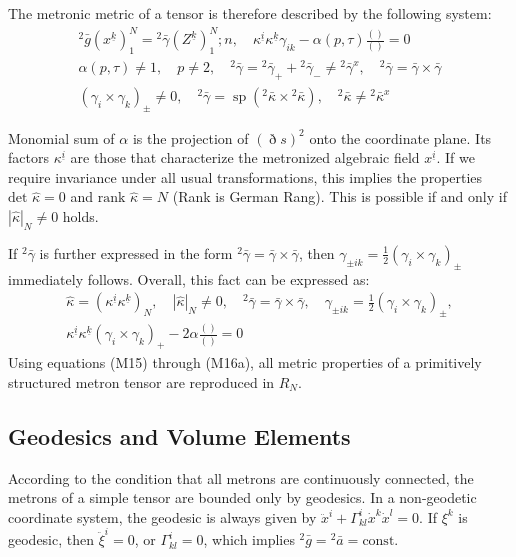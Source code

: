 \documentclass[11pt,a4paper,oneside]{article}
\DeclareMathOperator{\spn}{sp}
\newcommand{\ethop}{\eth}
\begin{document}
The metronic metric of a tensor is therefore described by the following system:
\begin{equation}
    \begin{gathered}
    {}^2 \bar{g}(x^{\underline{k}})^N_1 = {}^2 \bar{\gamma}(Z^{\underline{k}})^N_1; n,\quad \kappa^{\underline{i}} \kappa^{\underline{k}} \gamma_{ik}-\alpha(p,\tau)\frac { ()}{()} = 0 \\
    \alpha(p,\tau)\neq 1,\quad p \neq 2,\quad {}^2 \bar{\gamma} = {}^2 \bar{ \gamma}_+ + {}^2 \bar{\gamma}_- \neq {}^2 \bar{\gamma}^x,\quad {}^2 \bar{\gamma} = \bar{\gamma} \times \bar{\gamma} \\
    (\gamma_i \times \gamma_k)_{\pm} \neq 0,\quad {}^2 \bar{\gamma} = \spn({}^2 \bar{\kappa} \times {}^2 \bar{\kappa}),\quad {}^2 \bar{\kappa} \neq {}^2 \bar{\kappa}^x 
    \end{gathered} \tag {M16}
\end{equation}

Monomial sum of $\alpha$ is the projection of $(\ethop s)^2$ onto the coordinate plane. Its factors $\kappa^{\underline{i}}$ are those that characterize the metronized algebraic field $x^{\underline{i}}$. If we require invariance under all usual transformations, this implies the properties $\text{det } \hat {\kappa} = 0$ and $\text{rank } \hat {\kappa} = N$ (Rank is German Rang). This is possible if and only if $| \hat {\kappa} |_N \neq 0$ holds.

If ${}^2 \bar{\gamma}$ is further expressed in the form ${}^2 \bar{\gamma} = \bar{\gamma} \times \bar{\gamma}$, then $\gamma_{\pm ik} = \frac {1}{2}(\gamma_i \times \gamma_k)_{\pm}$ immediately follows. Overall, this fact can be expressed as:
\begin{equation}
    \begin{gathered}
    \hat {\kappa} =(\kappa^{\underline {i}} \kappa^{\underline {k}})_N,\quad | \hat {\kappa} |_N \neq 0,\quad {}^2 \bar{\gamma} = \bar{\gamma} \times \bar{\gamma},\quad \gamma_{\pm ik} = \frac {1}{2}( \gamma_i \times \gamma_k)_{\pm}, \\
    \kappa^{\underline{i}} \kappa^{\underline{k}}(\gamma_i \times \gamma_k)_+ -2 \alpha \frac {()}{()} = 0 
    \end{gathered} \tag {M16a}
\end{equation}
Using equations (M15) through (M16a), all metric properties of a primitively structured metron tensor are reproduced in $R_N$.

\subsection{Geodesics and Volume Elements}
According to the condition that all metrons are continuously connected, the metrons of a simple tensor are bounded only by geodesics. In a non-geodetic coordinate system, the geodesic is always given by $\ddot {x}^i + \Gamma^i_{kl} \dot {x}^k \dot {x}^l = 0$. If $\xi^k$ is geodesic, then $\ddot {\xi}^i = 0$, or $\Gamma^i_{kl} = 0$, which implies ${}^2 \bar{g} = {}^2 \bar{a} = \text{const}$.
\end{document}
